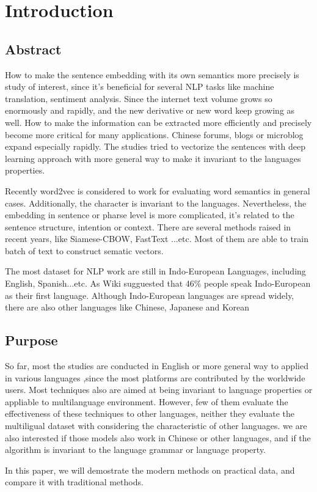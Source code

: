 \chapter{Introduction}
\setlength{\baselineskip}{1.5em}
\setlength{\parindent}{2em}
\setlength{\parskip}{1em}

\section{Abstract}

How to make the sentence embedding with its own semantics more precisely is study of interest, since it's beneficial for several NLP tasks like machine translation, sentiment analysis. 
Since the internet text volume grows so enormously and rapidly, and the new derivative or new word keep growing as well.
How to make the information can be extracted more efficiently and precisely become more critical for many applications.  
Chinese forums, blogs or microblog expand especially rapidly. The studies tried to vectorize the sentences with deep learning approach with more general way to make it invariant to the languages properties.  


Recently word2vec\cite{word2vec} is considered to work for evaluating word semantics in general cases.  
Additionally, the character is invariant to the languages. Nevertheless, 
the embedding in sentence or pharse level is more complicated, it's related to the sentence structure,  
intention or context. There are several methods raised in recent years, like Siamese-CBOW, FastText ...etc. 
Most of them are able to train batch of text to construct sematic vectors.

The most dataset for NLP work are still in Indo-European Languages, including English, Spanish...etc. As Wiki sugguested that 46\% people speak Indo-European as their first language. 
Although Indo-European languages are spread widely, there are also other languages like Chinese, Japanese and Korean

\section{Purpose}

So far, most the studies are conducted in English or more general way to applied in various languages
,since the most platforms are contributed by the worldwide users. Most techniques also are aimed at being invariant to language properties or appliable to multilanguage environment. 
However, few of them evaluate the effectiveness of these techniques to other languages, neither they evaluate the multiligual dataset with considering the characteristic of other languages.   
we are also interested if those models also work in Chinese or other languages, and if the algorithm is invariant to the language grammar or language property. 

In this paper, we will demostrate the modern methods on practical data, and compare it with traditional methods.